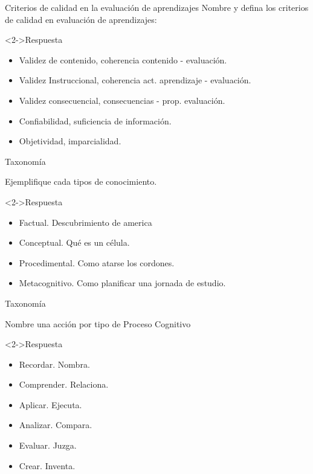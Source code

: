 \documentclass[11pt, aspectratio=169, xcolor=table,hyphens]{beamer}
\begin{document}
\begin{frame}{Criterios de calidad en la evaluación de aprendizajes}
	Nombre y defina los criterios de calidad en evaluación de aprendizajes:

	\begin{block}<2->{Respuesta}
		\begin{itemize}[<+->]
			\item Validez de contenido, coherencia contenido - evaluación.
			\item Validez Instruccional, coherencia act. aprendizaje - evaluación.
			\item Validez consecuencial, consecuencias - prop. evaluación.
			\item Confiabilidad, suficiencia de información.
			\item Objetividad, imparcialidad.
		\end{itemize}
		\begin{flushright}
			\cite{FORSTER2008}
		\end{flushright}
	\end{block}
\end{frame}

\begin{frame}{Taxonomía}
	\begin{center}
		Ejemplifique cada tipos de conocimiento.
	\end{center}
	\begin{block}<2->{Respuesta}
		\begin{itemize}[<2->]
			\item Factual. Descubrimiento de america
			\item Conceptual. Qué es un célula.
			\item Procedimental. Como atarse los cordones.
			\item Metacognitivo. Como planificar una jornada de estudio.
		\end{itemize}
		\begin{flushright}
			\cite{KRATWOHL2002}
		\end{flushright}
	\end{block}
\end{frame}

\begin{frame}{Taxonomía}
	\begin{center}
		Nombre una acción por tipo de Proceso Cognitivo
	\end{center}
	\begin{block}<2->{Respuesta}
		\begin{itemize}[<2->]
			\item Recordar. Nombra.
			\item Comprender. Relaciona.
			\item Aplicar. Ejecuta.
			\item Analizar. Compara.
			\item Evaluar. Juzga.
			\item Crear. Inventa.
		\end{itemize}
		\begin{flushright}
			\cite{KRATWOHL2002}
		\end{flushright}

	\end{block}
\end{frame}
\end{document}
